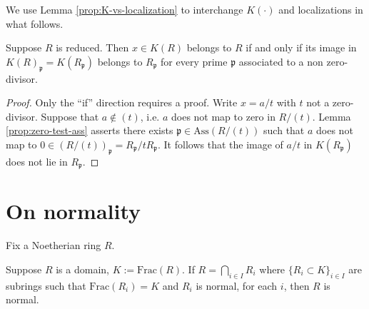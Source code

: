 We use Lemma \ref{prop:K-vs-localization} to interchange $K(\cdot)$ and localizations in what follows.
\begin{lemma}\label{prop:intersection-ass}
	Suppose $R$ is reduced. Then $x \in K(R)$ belongs to $R$ if and only if its image in $K(R)_{\mathfrak{p}} = K(R_{\mathfrak{p}})$ belongs to $R_{\mathfrak{p}}$ for every prime $\mathfrak{p}$ associated to a non zero-divisor.
\end{lemma}
\begin{proof}
	Only the ``if'' direction requires a proof. Write $x = a/t$ with $t$ not a zero-divisor. Suppose that $a \notin (t)$, i.e. $a$ does not map to zero in $R/(t)$. Lemma \ref{prop:zero-test-ass} asserts there exists $\mathfrak{p} \in \text{Ass}(R/(t))$ such that $a$ does not map to $0 \in (R/(t))_{\mathfrak{p}} = R_{\mathfrak{p}}/t R_{\mathfrak{p}}$. It follows that the image of $a/t$ in $K(R_{\mathfrak{p}})$ does not lie in $R_{\mathfrak{p}}$.
\end{proof}

\section{On normality}
Fix a Noetherian ring $R$.

\begin{exercise}
	Suppose $R$ is a domain, $K := \text{Frac}(R)$. If $R = \bigcap_{i \in I} R_i$ where $\{ R_i \subset K\}_{i \in I}$ are subrings such that $\text{Frac}(R_i) = K$ and $R_i$ is normal, for each $i$, then $R$ is normal.
\end{exercise}

